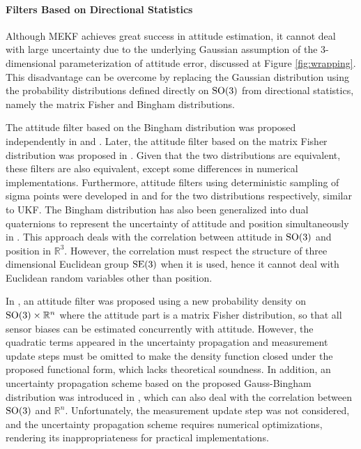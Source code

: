 \paragraph{Filters Based on Directional Statistics}

Although MEKF achieves great success in attitude estimation, it cannot deal with large uncertainty due to the underlying Gaussian assumption of the 3-dimensional parameterization of attitude error, discussed at Figure \ref{fig:wrapping}.
This disadvantage can be overcome by replacing the Gaussian distribution using the probability distributions defined directly on $\mathrm{SO}(3)$ from directional statistics, namely the matrix Fisher and Bingham distributions.

The attitude filter based on the Bingham distribution was proposed independently in \cite{glover2014tracking} and \cite{kurz2014recursive}.
Later, the attitude filter based on the matrix Fisher distribution was proposed in \cite{lee2018bayesian}.
Given that the two distributions are equivalent, these filters are also equivalent, except some differences in numerical implementations.
Furthermore, attitude filters using deterministic sampling of sigma points were developed in \cite{gilitschenski2015unscented} and \cite{lee2018bayesian} for the two distributions respectively, similar to UKF.
The Bingham distribution has also been generalized into dual quaternions to represent the uncertainty of attitude and position simultaneously in \cite{arun2018probabilistic,gilitschenski2014new,li2019geometry,li2020unscented}.
This approach deals with the correlation between attitude in $\mathrm{SO}(3)$ and position in $\mathbb{R}^3$.
However, the correlation must respect the structure of three dimensional Euclidean group $\mathrm{SE}(3)$ when it is used, hence it cannot deal with Euclidean random variables other than position.

In \cite{markley2006attitude}, an attitude filter was proposed using a new probability density on $\mathrm{SO}(3)\times \mathbb{R}^n$ where the attitude part is a matrix Fisher distribution, so that all sensor biases can be estimated concurrently with attitude.
However, the quadratic terms appeared in the uncertainty propagation and measurement update steps must be omitted to make the density function closed under the proposed functional form, which lacks theoretical soundness.
In addition, an uncertainty propagation scheme based on the proposed Gauss-Bingham distribution was introduced in \cite{darling2016uncertainty}, which can also deal with the correlation between $\mathrm{SO}(3)$ and $\mathbb{R}^n$.
Unfortunately, the measurement update step was not considered, and the uncertainty propagation scheme requires numerical optimizations, rendering its inappropriateness for practical implementations.

